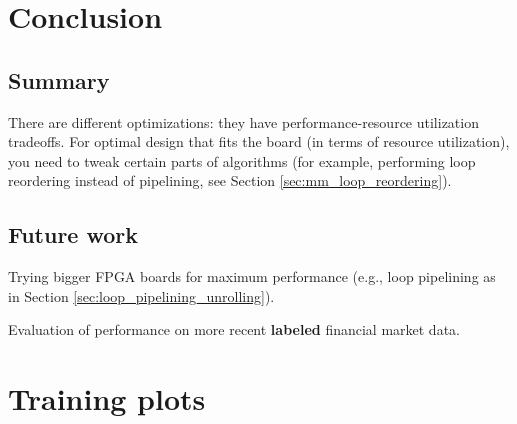 \documentclass[a4paper, twoside]{report}
\theoremstyle{definition}
\numberwithin{equation}{section}
\begin{document}


\newpage
\chapter*{Conclusion}

\section{Summary}

There are different optimizations: they have performance-resource utilization tradeoffs.
For optimal design that fits the board (in terms of resource utilization),
you need to tweak certain parts of algorithms (for example, performing loop
reordering instead of pipelining, see Section \ref{sec:mm_loop_reordering}).

\section{Future work}
Trying bigger FPGA boards for maximum performance (e.g., loop pipelining as in Section \ref{sec:loop_pipelining_unrolling}).

Evaluation of performance on more recent \textbf{labeled} financial market data.


\newpage
\appendix
\chapter{Training plots} \label{app:training_plots}
\end{document}
